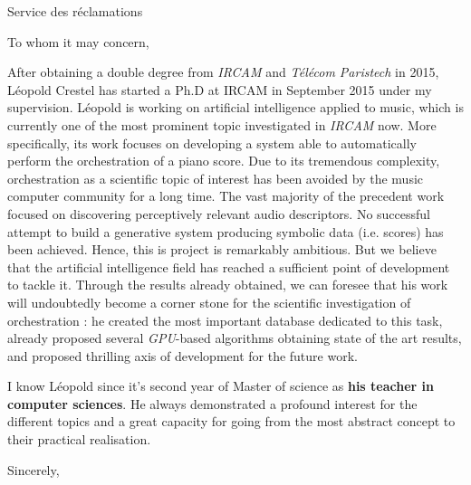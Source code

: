 \documentclass[12pt]{lettre}
\begin{document}
\begin{letter}{Service des réclamations}
\address{Jean Râleur\\4, rue du Bac à sable\\80886 Sassone-le-Creux}
\nofax

\def\concname{Objet :~} %
\opening{To whom it may concern,}


After obtaining a double degree from \textit{IRCAM} and \textit{Télécom Paristech} in 2015, Léopold Crestel has started a Ph.D at IRCAM in September 2015 under my supervision. 
Léopold is working on artificial intelligence applied to music, which is currently one of the most prominent topic investigated in \textit{IRCAM} now. More specifically, its work focuses on developing a system able to automatically perform the orchestration of a piano score.
Due to its tremendous complexity, orchestration as a scientific topic of interest has been avoided by the music computer community for a long time. 
The vast majority of the precedent work focused on discovering perceptively relevant audio descriptors.
No successful attempt to build a generative system producing symbolic data (i.e. scores) has been achieved.
Hence, this is project is remarkably ambitious. But we believe that the artificial intelligence field has reached a sufficient point of development to tackle it.
Through the results already obtained, we can foresee that his work will undoubtedly become a corner stone for the scientific investigation of orchestration : he created the most important database dedicated to this task, already proposed several \textit{GPU}-based algorithms obtaining state of the art results, and proposed thrilling axis of development for the future work.

I know Léopold since it's second year of Master of science as \textbf{his teacher in computer sciences}. He always demonstrated a profound interest for the different topics and a great capacity for going from the most abstract concept to their practical realisation.



\closing{Sincerely,}

\end{letter}
\end{document}
